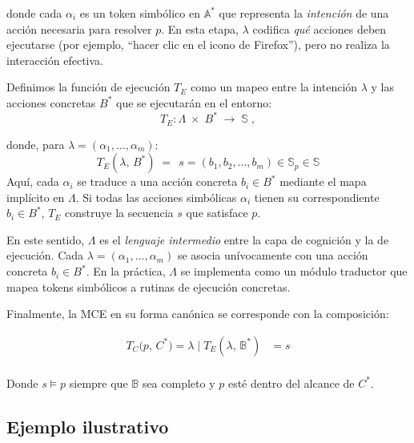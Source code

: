 donde cada \(\alpha_i\) es un token simbólico en \(\mathbb{A}^*\) que representa
la \emph{intención} de una acción necesaria para resolver \(p\). En esta etapa,
\(\lambda\) codifica \emph{qué} acciones deben ejecutarse (por ejemplo, “hacer
clic en el icono de Firefox”), pero no realiza la interacción efectiva.

Definimos la función de ejecución \(T_E\) como un mapeo entre la intención
\(\lambda\) y las acciones concretas \(B^*\) que se ejecutarán en el entorno:
\begin{equation}
T_E : \Lambda \;\times\; B^* \;\longrightarrow\; \mathbb{S} \;,
\end{equation}

donde, para \(\lambda = (\alpha_1, \dots, \alpha_m)\):
\begin{equation}
T_E(\lambda,\,B^*) 
\;=\; 
\,s = (b_1, b_2, \dots, b_m) \in \mathbb{S}_p \in \mathbb{S}
\end{equation}
Aquí, cada \(\alpha_i\) se traduce a una acción concreta \(b_i \in B^*\)
mediante el mapa implícito en \(\Lambda\). Si todas las acciones simbólicas
\(\alpha_i\) tienen su correspondiente \(b_i \in B^*\), \(T_E\) construye la
secuencia \(s\) que satisface \(p\).

En este sentido, \(\Lambda\) es el \emph{lenguaje intermedio} entre la capa de
cognición y la de ejecución. Cada \(\lambda = (\alpha_1, \ldots, \alpha_m)\) 
 se asocia unívocamente con una acción concreta
\(b_i \in B^*\). En la práctica, \(\Lambda\) se implementa como un módulo
traductor que mapea tokens simbólicos a rutinas de ejecución concretas.

Finalmente, la MCE en su forma canónica se corresponde con la composición:

\begin{equation}
\begin{aligned}
T_C\bigl(p,\,C^*\bigr) = \lambda \;|\; T_E(\lambda,\,\mathbb{B}^*) &= s \\
\end{aligned}
\end{equation}

Donde \(s \models p\) siempre que \(\mathbb{B}\) sea completo y \(p\) esté
dentro del alcance de \(C^*\).

\subsection*{Ejemplo ilustrativo}

